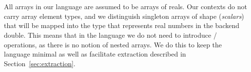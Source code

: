\begin{code}[hide]%
%
\>[2]\<%
\\
\>[0]\<%
\\
\>[0]\<%
\\
\>[0]\<%
\\
\>[0]\<%
\\
\>[0]\<%
\\
\>[0]\<%
\\
\>[0]\<%
\\
\>[0]\<%
\\
\>[0]\<%
\\
%
\\[\AgdaEmptyExtraSkip]%
\>[0][@{}l@{\AgdaIndent{0}}]%
\>[2]\AgdaSpace{}%
\AgdaSpace{}%
\<%
\\
%
\>[2]\AgdaSpace{}%
\AgdaSpace{}%
\<%
\end{code}

All arrays in our language are assumed to be arrays of reals.  Our contexts
do not carry array element types, and we distinguish
singleton arrays of shape \AC{[]} (\emph{scalars}) that will be mapped
into the type that represents real numbers in the backend \eg{} double.
This means that in the language we do not need to introduce
/ operations, as there is no notion of nested arrays.
We do this to keep the language minimal as well as facilitate extraction
described in Section~\ref{sec:extraction}. 


